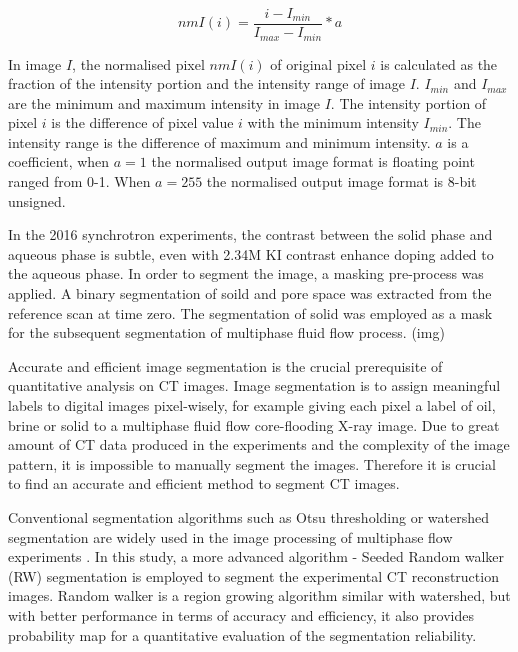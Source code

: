 $$ nmI(i)=\frac{i-I_{min}}{I_{max}-I_{min}}*a$$

In image $I$, the normalised pixel $nmI(i)$ of original pixel $i$ is calculated as the fraction of the intensity portion and the intensity range of image $I$. $I_{min}$ and $I_{max}$ are the minimum and maximum intensity in image $I$. The intensity portion of pixel $i$ is the difference of pixel value $i$ with the minimum intensity $I_{min}$. The intensity range is the difference of maximum and minimum intensity. $a$ is a coefficient, when $a=1$ the normalised output image format is floating point ranged from 0-1. When $a=255$ the normalised output image format is 8-bit unsigned.

In the 2016 synchrotron experiments, the contrast between the solid phase and aqueous phase is subtle, even with 2.34M KI contrast enhance doping added to the aqueous phase. In order to segment the image, a masking pre-process was applied. A binary segmentation of soild and pore space was extracted from the reference scan at time zero. The segmentation of solid was employed as a mask for the subsequent segmentation of multiphase fluid flow process. (img) 

Accurate and efficient image segmentation is the crucial prerequisite of quantitative analysis on CT images. Image segmentation is to assign meaningful labels to digital images pixel-wisely, for example giving each pixel a label of oil, brine or solid to a multiphase fluid flow core-flooding X-ray image. Due to great amount of CT data produced in the experiments and the complexity of the image pattern, it is impossible to manually segment the images. Therefore it is crucial to find an accurate and efficient method to segment CT images.

Conventional segmentation algorithms such as Otsu thresholding \citep{otsu1979threshold} or watershed segmentation \citep{serra1983image} are widely used in the image processing of multiphase flow experiments \citep[e.g.]{andrew2015imaging,singh2016imaging}. In this study, a more advanced algorithm - Seeded Random walker (RW) segmentation \citep{grady2005multilabel} is employed to segment the experimental CT reconstruction images. Random walker is a region growing algorithm similar with watershed, but with better performance in terms of accuracy and efficiency, it also provides probability map for a quantitative evaluation of the segmentation reliability.


